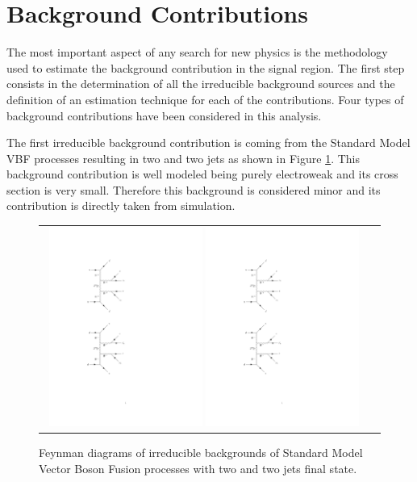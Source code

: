 \section{Background Contributions}

The most important aspect of any search for new physics is the methodology used to estimate the background contribution in the signal region. The first step consists in the determination of all the irreducible background sources and the definition of an estimation technique for each of the contributions. Four types of background contributions have been considered in this analysis. 

The first irreducible background contribution is coming from the Standard Model VBF processes resulting in two \hadtau and two jets as shown in Figure \ref{fig:background_SMVBF}. This background contribution is well modeled being purely electroweak and its cross section is very small. Therefore this background is considered minor and its contribution is directly taken from simulation.

\begin{figure}[tbh!]
	\centering
	\begin{tabular}{cc}
		\includegraphics[width=0.48\textwidth]{diagrams/pics/background_SMVBFminus.pdf}
		\includegraphics[width=0.48\textwidth]{diagrams/pics/background_SMVBFplus.pdf} 		
	\end{tabular}
	\caption{Feynman diagrams of irreducible backgrounds of Standard Model Vector Boson Fusion processes with two \hadtau and two jets final state. }
	\label{fig:background_SMVBF}
\end{figure}

